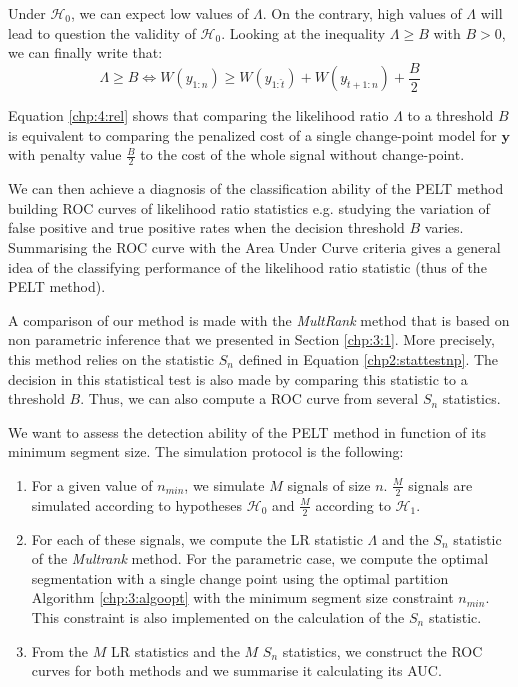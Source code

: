 Under $\mathcal{H}_0$, we can expect low values of $\Lambda$. On the contrary, high values of $\Lambda$ will lead to question the validity of $\mathcal{H}_0$. Looking at the inequality $\Lambda \geq B$ with $B > 0$, we can finally write that: 
 \begin{equation}\label{chp:4:rel}
 \Lambda \geq B \iff W(y_{1:n}) \geq W(y_{1:\widehat{t}})+W(y_{\widehat{t}+1:n})+\frac{B}{2}
 \end{equation} 

Equation \eqref{chp:4:rel} shows that comparing the likelihood ratio $\Lambda$ to a threshold $B$ is equivalent to comparing the penalized cost of a single change-point model for $\bm y$ with penalty value $\frac{B}{2}$ to the cost of the whole signal without change-point.

We can then achieve a diagnosis of the classification ability of the PELT method building ROC curves of likelihood ratio statistics \citep{Fawcett2006} e.g. studying the variation of false positive and true positive rates when the decision threshold $B$ varies. Summarising the ROC curve with the Area Under Curve criteria gives a general idea of the classifying performance of the likelihood ratio statistic (thus of the PELT method).

A comparison of our method is made with the \textit{MultRank} method that is based on non parametric inference that we presented in Section \ref{chp:3:1}. More precisely, this method relies on the statistic $S_n$ defined in Equation \eqref{chp2:stattestnp}. The decision in this statistical test is also made by comparing this statistic to a threshold $B$. Thus, we can also compute a ROC curve from several $S_n$ statistics.  


We want to assess the detection ability of the PELT method in function of its minimum segment size. The simulation protocol is the following:  
\begin{enumerate}
\item For a given value of $n_{min}$, we simulate $M$ signals of size $n$. $\frac{M}{2}$ signals are simulated according to hypotheses $\mathcal{H}_0$ and $\frac{M}{2}$ according to $\mathcal{H}_1$.
\item For each of these signals, we compute the LR statistic $\Lambda$ and the $S_n$ statistic of the \textit{Multrank} method. For the parametric case, we compute the optimal segmentation with a single change point using the optimal partition Algorithm \ref{chp:3:algoopt} with the minimum segment size constraint $n_{min}$. This constraint is also implemented on the calculation of the $S_n$ statistic.  
\item From the $M$ LR statistics and the $M$ $S_n$ statistics, we construct the ROC curves for both methods and we summarise it calculating its AUC. 
\end{enumerate}

